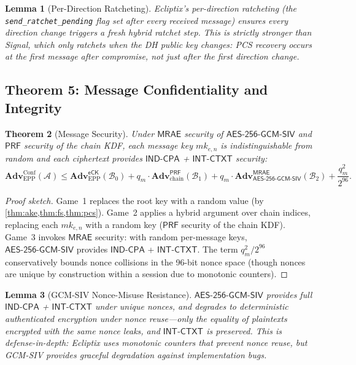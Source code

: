 \documentclass[11pt,a4paper]{article}
\newtheorem{theorem}{Theorem}[section]
\newtheorem{lemma}[theorem]{Lemma}
\theoremstyle{definition}
\newcommand{\adv}{\mathbf{Adv}}
\newcommand{\advA}{\mathcal{A}}
\newcommand{\advB}{\mathcal{B}}
\newcommand{\AEAD}{\textsf{AES-256-GCM-SIV}}
\newcommand{\INDCPA}{\textsf{IND-CPA}}
\newcommand{\INTCTXT}{\textsf{INT-CTXT}}
\newcommand{\MRAE}{\textsf{MRAE}}
\newcommand{\PRF}{\textsf{PRF}}
\newcommand{\eCK}{\textsf{eCK}}
\newcommand{\mk}{\mathit{mk}}
\begin{document}
\begin{lemma}[Per-Direction Ratcheting]\label{lem:per-direction}
Ecliptix's per-direction ratcheting (the \texttt{send\_ratchet\_pending} flag set after every received message) ensures every direction change triggers a fresh hybrid ratchet step. This is strictly stronger than Signal, which only ratchets when the DH public key changes: PCS recovery occurs at the first message after compromise, not just after the first direction change.
\end{lemma}

\subsection{Theorem 5: Message Confidentiality and Integrity}

\begin{theorem}[Message Security]\label{thm:msg-security}
Under $\MRAE$ security of $\AEAD$ and $\PRF$ security of the chain KDF, each message key $\mk_{e,n}$ is indistinguishable from random and each ciphertext provides $\INDCPA$ + $\INTCTXT$ security:
\[
  \adv^{\mathrm{Conf}}_{\mathrm{EPP}}(\advA) \leq \adv^{\eCK}_{\mathrm{EPP}}(\advB_0) + q_m \cdot \adv^{\PRF}_{\mathrm{chain}}(\advB_1) + q_m \cdot \adv^{\MRAE}_{\AEAD}(\advB_2) + \frac{q_m^2}{2^{96}}.
\]
\end{theorem}

\begin{proof}[Proof sketch]
Game~1 replaces the root key with a random value (by \cref{thm:ake,thm:fs,thm:pcs}). Game~2 applies a hybrid argument over chain indices, replacing each $\mk_{e,n}$ with a random key ($\PRF$ security of the chain KDF). Game~3 invokes $\MRAE$ security: with random per-message keys, $\AEAD$ provides $\INDCPA$ + $\INTCTXT$. The term $q_m^2/2^{96}$ conservatively bounds nonce collisions in the 96-bit nonce space (though nonces are unique by construction within a session due to monotonic counters).
\end{proof}

\begin{lemma}[GCM-SIV Nonce-Misuse Resistance]\label{lem:gcm-siv}
$\AEAD$ provides full $\INDCPA$ + $\INTCTXT$ under unique nonces, and degrades to deterministic authenticated encryption under nonce reuse---only the equality of plaintexts encrypted with the same nonce leaks, and $\INTCTXT$ is preserved. This is defense-in-depth: Ecliptix uses monotonic counters that prevent nonce reuse, but GCM-SIV provides graceful degradation against implementation bugs.
\end{lemma}
\end{document}
